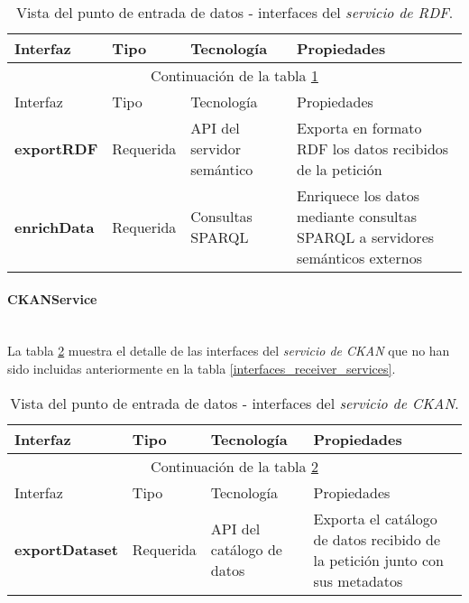 \begin{longtable}[c]{|p{25mm}|p{20mm}|p{30mm}|p{60mm}|}
	\caption{Vista del punto de entrada de datos - interfaces del \textit{servicio de RDF}.\label{interfaces_receiver_rdfservice}}\\
		\hline
			Interfaz & Tipo & Tecnología & Propiedades\\
		\hline
		\hline
	\endfirsthead
		\hline
		\multicolumn{4}{|c|}{Continuación de la tabla \ref{interfaces_receiver_rdfservice}}\\
		\hline
			Interfaz & Tipo & Tecnología & Propiedades\\
		\hline
		\hline
	\endhead
	\hline
	\endfoot
		\textbf{exportRDF} & Requerida & API del servidor semántico & Exporta en formato RDF los datos recibidos de la petición \\
		\hline
		\textbf{enrichData} & Requerida & Consultas SPARQL & Enriquece los datos mediante consultas SPARQL a servidores semánticos externos \\
	\hline
	\hline
\end{longtable}


\paragraph{CKANService} \hfill \\
La tabla \ref{interfaces_receiver_ckanservice} muestra el detalle de las interfaces del \textit{servicio de CKAN} que no han sido incluidas anteriormente en la tabla \ref{interfaces_receiver_services}.  

\begin{longtable}[c]{|p{25mm}|p{20mm}|p{30mm}|p{60mm}|}
	\caption{Vista del punto de entrada de datos - interfaces del \textit{servicio de CKAN}.\label{interfaces_receiver_ckanservice}}\\
		\hline
			Interfaz & Tipo & Tecnología & Propiedades\\
		\hline
		\hline
	\endfirsthead
		\hline
		\multicolumn{4}{|c|}{Continuación de la tabla \ref{interfaces_receiver_ckanservice}}\\
		\hline
			Interfaz & Tipo & Tecnología & Propiedades\\
		\hline
		\hline
	\endhead
	\hline
	\endfoot
		\textbf{exportDataset} & Requerida & API del catálogo de datos & Exporta el catálogo de datos recibido de la petición junto con sus metadatos \\
	\hline
	\hline
\end{longtable}
